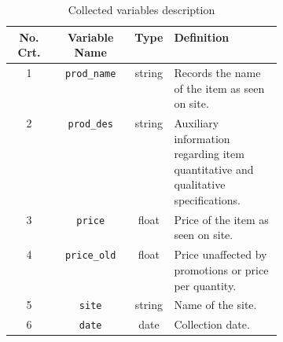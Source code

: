 \documentclass[]{article}
\begin{document}
\begin{table}[h!]
	\centering
	\begin{tabular}{ c c c p{0.4\linewidth}}
		\hline
		 No. Crt. & Variable Name & Type & Definition  \\
		\hline  
		1 & \texttt{prod\_name} & string & Records the name of the item as seen on site.\\  \hline
		2 & \texttt{prod\_des}  & string & Auxiliary information regarding item quantitative and qualitative specifications. \\ \hline
		3 & \texttt{price}	  	& float  & Price of the item as seen on site.  \\ \hline
		4 & \texttt{price\_old} & float  & Price unaffected by promotions or price per quantity.\\ \hline
		5 & \texttt{site}	  	& string & Name of the site. \\ \hline
		6 & \texttt{date} 	  	& date   & Collection date. \\ 
		\hline
	\end{tabular}
	\caption{Collected variables description}
	\label{table:1}
\end{table}
\end{document}
